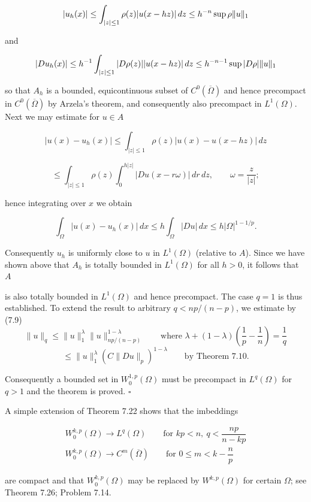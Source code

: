 \[
|u_h(x)| \le \int_{|z|\le 1} \rho(z)|u(x-hz)|\,dz \le h^{-n}\sup \rho \lVert u\rVert_1
\]

and

\[
|Du_h(x)| \le h^{-1}\int_{|z|\le 1} |D\rho(z)||u(x-hz)|\,dz \le h^{-n-1}\sup |D\rho| \lVert u\rVert_1
\]

so that $A_h$ is a bounded, equicontinuous subset of $C^0(\overline{\Omega})$ and hence precompact
in $C^0(\overline{\Omega})$ by Arzela's theorem, and consequently also precompact in $L^1(\Omega)$. Next
we may estimate for $u \in A$

\[
|u(x)-u_h(x)| \le \int_{|z|\le 1} \rho(z)|u(x)-u(x-hz)|\,dz
\]

\[
\le \int_{|z|\le 1} \rho(z)\int_0^{h|z|} |Du(x-r\omega)|\,dr\,dz,\qquad \omega=\frac{z}{|z|};
\]

hence integrating over $x$ we obtain

\[
\int_{\Omega}|u(x)-u_h(x)|\,dx \le h \int_{\Omega}|Du|\,dx \le h|\Omega|^{1-1/p}.
\]

Consequently $u_h$ is uniformly close to $u$ in $L^1(\Omega)$ (relative to $A$). Since we have
shown above that $A_h$ is totally bounded in $L^1(\Omega)$ for all $h>0$, it follows that $A$



is also totally bounded in $L^1(\Omega)$ and hence precompact. The case $q=1$ is thus established. To extend the result to arbitrary $q<np/(n-p)$, we estimate by (7.9)
\[
\|u\|_q\le \|u\|_1^{\lambda}\|u\|_{np/(n-p)}^{1-\lambda}
\qquad \text{where } \lambda+(1-\lambda)\left(\frac{1}{p}-\frac{1}{n}\right)=\frac{1}{q}
\]
\[
\le \|u\|_1^{\lambda}(C\|Du\|_p)^{1-\lambda}
\qquad \text{by Theorem 7.10.}
\]

Consequently a bounded set in $W_0^{1,p}(\Omega)$ must be precompact in $L^q(\Omega)$ for $q>1$
and the theorem is proved. $\square$

A simple extension of Theorem 7.22 shows that the imbeddings

\[
\begin{array}{c}
W_0^{k,p}(\Omega)\to L^q(\Omega)\qquad \text{for } kp<n,\ q<\dfrac{np}{n-kp}\\[2.2ex]
W_0^{k,p}(\Omega)\to C^m(\overline{\Omega})\qquad \text{for } 0\le m<k-\dfrac{n}{p}
\end{array}
\]

are compact and that $W_0^{k,p}(\Omega)$ may be replaced by $W^{k,p}(\Omega)$ for certain $\Omega$; see
Theorem 7.26; Problem 7.14.

